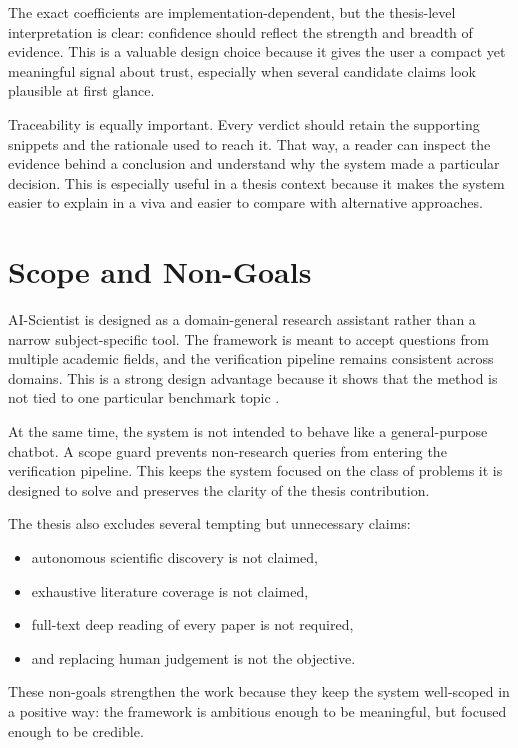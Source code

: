 The exact coefficients are implementation-dependent, but the thesis-level interpretation is clear: confidence should reflect the strength and breadth of evidence. This is a valuable design choice because it gives the user a compact yet meaningful signal about trust, especially when several candidate claims look plausible at first glance.

Traceability is equally important. Every verdict should retain the supporting snippets and the rationale used to reach it. That way, a reader can inspect the evidence behind a conclusion and understand why the system made a particular decision. This is especially useful in a thesis context because it makes the system easier to explain in a viva and easier to compare with alternative approaches.

\section{Scope and Non-Goals}

AI-Scientist is designed as a domain-general research assistant rather than a narrow subject-specific tool. The framework is meant to accept questions from multiple academic fields, and the verification pipeline remains consistent across domains. This is a strong design advantage because it shows that the method is not tied to one particular benchmark topic \cite{petroni2020kilt,thakur2021beir,gu2021pubmedbert}.

At the same time, the system is not intended to behave like a general-purpose chatbot. A scope guard prevents non-research queries from entering the verification pipeline. This keeps the system focused on the class of problems it is designed to solve and preserves the clarity of the thesis contribution.

The thesis also excludes several tempting but unnecessary claims:
\begin{itemize}[leftmargin=*]
    \item autonomous scientific discovery is not claimed,
    \item exhaustive literature coverage is not claimed,
    \item full-text deep reading of every paper is not required,
    \item and replacing human judgement is not the objective.
\end{itemize}

These non-goals strengthen the work because they keep the system well-scoped in a positive way: the framework is ambitious enough to be meaningful, but focused enough to be credible.

